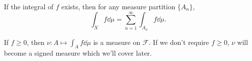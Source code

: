 \begin{corollary}
    If the integral of $f$ exists, then for any measure partition $\{A_n\}$,
	\[
	\int_X f\dd \mu = \sum_{n=1}^{\infty} \int_{A_n}f\dd \mu.
	\]
\end{corollary}

If $f\ge 0$, then $\nu: A\mapsto \int_A f\dd \mu$ is a measure on $\mathscr{F}$.
If we don't require $f\ge 0$, $\nu$ will become a signed measure
which we'll cover later.
